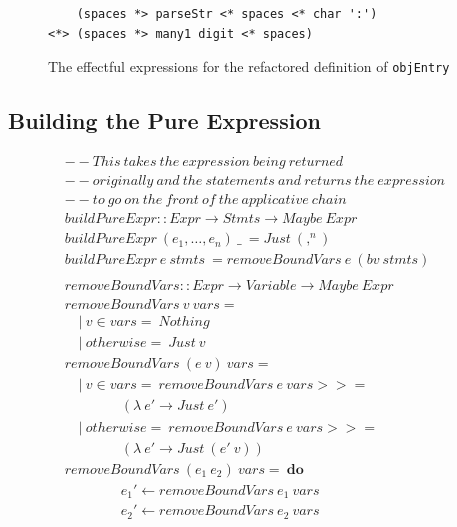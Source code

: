 \begin{figure}[t]
\begin{lstlisting}
    (spaces *> parseStr <* spaces <* char ':') 
<*> (spaces *> many1 digit <* spaces)
\end{lstlisting}
\caption{The effectful expressions for the refactored definition of \texttt{objEntry}}
\label{effectObjEntry}
\end{figure}


\subsection{Building the Pure Expression}

\vspace{5pt}
\begin{figure}[h!]
\begin{math}
\begin{aligned}
&--This\ takes\ the\ expression\ being\ returned\\
&--originally\ and\ the\ statements\ and\ returns\ the\ expression\\
&--to\ go\ on\ the\ front\ of\ the\ applicative\ chain\\
&buildPureExpr :: Expr \rightarrow Stmts \rightarrow Maybe\ Expr\\
&buildPureExpr\ (e_1,\ldots, e_n)\ \_\ = Just\ (,^n)\\
&buildPureExpr\ e\ stmts\ = removeBoundVars\ e\ (bv\ stmts)\\
\\
&removeBoundVars :: Expr \rightarrow {Variable} \rightarrow Maybe\ Expr\\
&removeBoundVars\ v\ vars =\\
&\quad |\ v \in vars =\ Nothing\\
&\quad |\ otherwise =\ Just\ v\\
&removeBoundVars\ (e\ v)\ vars =\\
&\quad |\ v \in vars =\ removeBoundVars\ e\ vars >>=\\ 
&\qquad \qquad(\lambda\ e' \rightarrow Just\ e')\\
&\quad |\ otherwise =\ removeBoundVars\ e\ vars >>=\\ 
&\qquad \qquad(\lambda\ e' \rightarrow Just\ (e'\ v))\\
&removeBoundVars\ (e_1\ e_2)\ vars =\ \textbf{do}\\
&\qquad \qquad e_1' \leftarrow removeBoundVars\ e_1\ vars\\
&\qquad \qquad e_2' \leftarrow removeBoundVars\ e_2\ vars\\

\end{aligned}
\end{math}
\end{figure}
